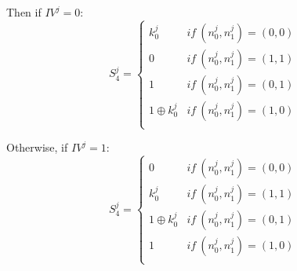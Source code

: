 \documentclass[a4paper,11pt,twocolumn]{article}
\begin{document}
		 \noindent Then if $IV^j = 0$: 
		 $$S _4^j =\left \{	
		 \begin{array}{ll}
		 	k_0^j& if\ (n_0^j,n_1^j)=(0,0)\\
		 	0& if\ (n_0^j,n_1^j)=(1,1)\\
		 	1& if\ (n_0^j,n_1^j)=(0,1)\\
		 	1 \oplus k_0^j& if\ (n_0^j,n_1^j)=(1,0)\\
		 \end{array}
		 \right.$$
		 
		 \noindent Otherwise, if $IV^j = 1$:
		 $$S _4^j =\left \{	
		 \begin{array}{ll}
		 	0& if\ (n_0^j,n_1^j)=(0,0)\\
		 	k_0^j& if\ (n_0^j,n_1^j)=(1,1)\\
		 	1 \oplus k_0^j& if\ (n_0^j,n_1^j)=(0,1)\\
		 	1& if\ (n_0^j,n_1^j)=(1,0)\\
		 \end{array}
		 \right.$$

	
\end{document}
